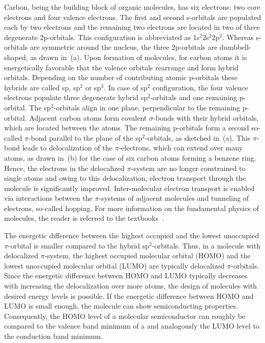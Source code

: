 Carbon, being the building block of organic molecules, has six electrons: two core electrons and four valence electrons.
The first and second s-orbitals are populated each by two electrons and the remaining two electrons are located in two of three degenerate 2p-orbitals. This configuration is abbreviated as 1s$^2$2s$^2$2p$^2$. Whereas s-orbitals are symmetric around the nucleus, the three 2p-orbitals are dumbbell-shaped\cite{Upper1974}, as drawn in \,(a).
%
Upon formation of molecules, for carbon atoms it is energetically favorable that the valence orbitals rearrange and form hybrid orbitals. Depending on the number of contributing atomic p-orbitals these hybrids are called sp, sp$^2$ or sp$^3$. In case of sp$^2$ configuration, the four valence electrons populate three degenerate hybrid sp$^2$-orbitals and one remaining p-orbital. The sp$^2$-orbitals align in one plane, perpendicular to the remaining p-orbital. Adjacent carbon atoms form covalent $\sigma$-bonds with their hybrid orbitals, which are located between the atoms. The remaining p-orbitals form a second so-called $\pi$-bond parallel to the plane of the sp$^2$-orbitals, as sketched in \,(a).
This $\pi$-bond leads to delocalization of the $\pi$-electrons, which can extend over many atoms, as drawn in \,(b) for the case of six carbon atoms forming a benzene ring. Hence, the electrons in the delocalized $\pi$-system are no longer constrained to single atoms and owing to this delocalization, electron transport through the molecule is significantly improved. Inter-molecular electron transport is enabled via interactions between the $\pi$-systems of adjacent molecules and tunneling of electrons, so-called hopping.
%
For more information on the fundamental physics of molecules, the reader is referred to the textbooks~\cite{HakenWolf,DemtroederExp3}.

The energetic difference between the highest occupied and the lowest unoccupied $\pi$-orbital is smaller compared to the hybrid sp$^2$-orbitals. Thus, in a molecule with delocalized $\pi$-system, the highest occupied molecular orbital (HOMO) and the lowest unoccupied molecular orbital (LUMO) are typically delocalized $\pi$-orbitals.
Since the energetic difference between HOMO and LUMO typically decreases with increasing the delocalization over more atoms, the design of molecules with desired energy levels is possible.
If the energetic difference between HOMO and LUMO is small enough, the molecule can show semiconducting properties.
Consequently, the HOMO level of a molecular semiconductor can roughly be compared to the valence band minimum of a \CSC and analogously the LUMO level to the conduction band minimum.

